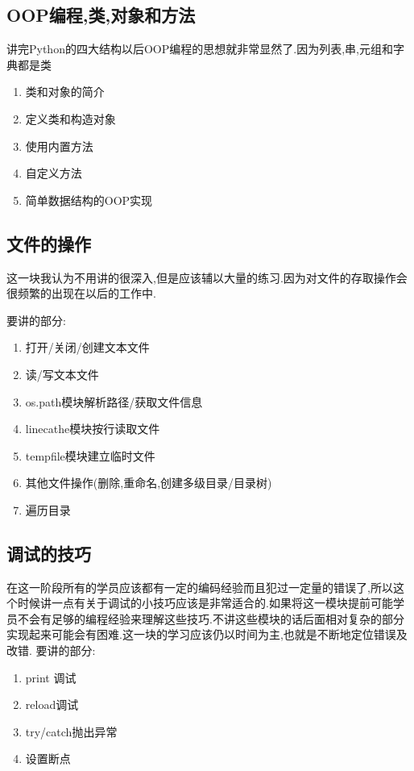 \documentclass[12pt,a4paper]{article}
\begin{document}
\subsection{OOP编程,类,对象和方法}
讲完Python的四大结构以后OOP编程的思想就非常显然了.因为列表,串,元组和字典都是类
\begin{enumerate}
\item 类和对象的简介
\item 定义类和构造对象
\item 使用内置方法
\item 自定义方法
\item 简单数据结构的OOP实现                                                                               

\end{enumerate}

\subsection{文件的操作}
这一块我认为不用讲的很深入,但是应该辅以大量的练习.因为对文件的存取操作会很频繁的出现在以后的工作中.

要讲的部分:
\begin{enumerate}
\item 打开/关闭/创建文本文件
\item 读/写文本文件
\item os.path模块解析路径/获取文件信息
\item linecathe模块按行读取文件
\item tempfile模块建立临时文件
\item 其他文件操作(删除,重命名,创建多级目录/目录树)
\item 遍历目录

\end{enumerate}

\subsection{调试的技巧}
在这一阶段所有的学员应该都有一定的编码经验而且犯过一定量的错误了,所以这个时候讲一点有关于调试的小技巧应该是非常适合的.如果将这一模块提前可能学员不会有足够的编程经验来理解这些技巧.不讲这些模块的话后面相对复杂的部分实现起来可能会有困难.这一块的学习应该仍以时间为主,也就是不断地定位错误及改错.
要讲的部分:
\begin{enumerate}
\item print 调试
\item reload调试
\item try/catch抛出异常
\item 设置断点
\end{enumerate}
\end{document}
